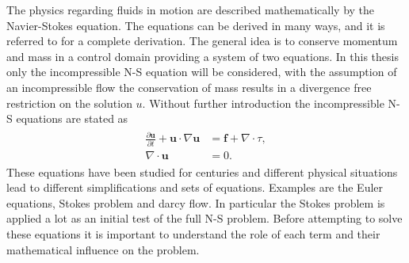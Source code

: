 The physics regarding fluids in motion are described mathematically by the Navier-Stokes equation. 
The equations can be derived in many ways, and it is referred to \cite{White} for a complete derivation.
The general idea is to conserve momentum and mass in a control domain providing a system of two equations.
In this thesis only the incompressible N-S equation will be considered, 
with the assumption of an incompressible flow the conservation of mass 
results in a divergence free restriction on the solution $u$.
Without further introduction the incompressible  N-S equations are stated as  
%
\begin{align}
    \begin{split}
    \frac{\partial \mathbf{u}}{\partial t} + \mathbf{u}\cdot \nabla\mathbf{u} &= 
    \mathbf{f} + \nabla \cdot \tau, \\
		\nabla \cdot \mathbf{u} &= 0.
    \end{split}
	\label{eq:NS}
\end{align}
%
These equations have been studied for centuries and different physical situations
lead to different simplifications and sets of equations.
Examples are the Euler equations,
Stokes problem and darcy flow.
In particular the Stokes problem is applied a lot as an initial test of the full N-S problem. 
Before attempting to solve these equations it is important to understand the role of each term 
and their mathematical influence on the problem. 

